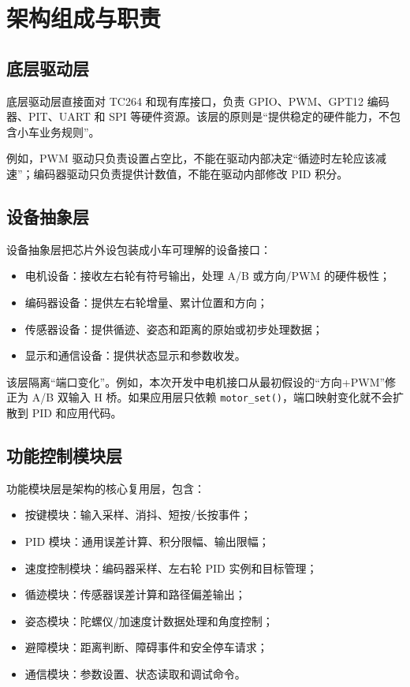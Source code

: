 \documentclass[11pt,a4paper,fontset=fandol]{ctexart}
\begin{document}
\section{架构组成与职责}

\subsection{底层驱动层}

底层驱动层直接面对 TC264 和现有库接口，负责 GPIO、PWM、GPT12 编码器、PIT、UART 和 SPI 等硬件资源。该层的原则是“提供稳定的硬件能力，不包含小车业务规则”。

例如，PWM 驱动只负责设置占空比，不能在驱动内部决定“循迹时左轮应该减速”；编码器驱动只负责提供计数值，不能在驱动内部修改 PID 积分。

\subsection{设备抽象层}

设备抽象层把芯片外设包装成小车可理解的设备接口：

\begin{itemize}
\item 电机设备：接收左右轮有符号输出，处理 A/B 或方向/PWM 的硬件极性；
\item 编码器设备：提供左右轮增量、累计位置和方向；
\item 传感器设备：提供循迹、姿态和距离的原始或初步处理数据；
\item 显示和通信设备：提供状态显示和参数收发。
\end{itemize}

该层隔离“端口变化”。例如，本次开发中电机接口从最初假设的“方向+PWM”修正为 A/B 双输入 H 桥。如果应用层只依赖 \texttt{motor\_set()}，端口映射变化就不会扩散到 PID 和应用代码。

\subsection{功能控制模块层}

功能模块层是架构的核心复用层，包含：

\begin{itemize}
\item 按键模块：输入采样、消抖、短按/长按事件；
\item PID 模块：通用误差计算、积分限幅、输出限幅；
\item 速度控制模块：编码器采样、左右轮 PID 实例和目标管理；
\item 循迹模块：传感器误差计算和路径偏差输出；
\item 姿态模块：陀螺仪/加速度计数据处理和角度控制；
\item 避障模块：距离判断、障碍事件和安全停车请求；
\item 通信模块：参数设置、状态读取和调试命令。
\end{itemize}
\end{document}
